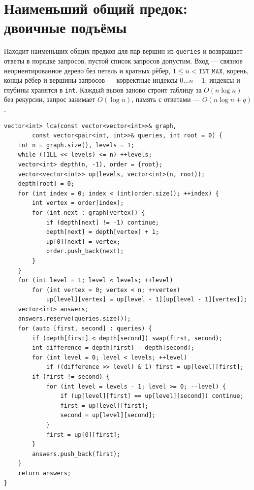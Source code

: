 \section{Наименьший общий предок: двоичные подъёмы}
Находит наименьших общих предков для пар вершин из \texttt{queries} и возвращает ответы в порядке запросов; пустой список запросов допустим.
Вход --- связное неориентированное дерево без петель и кратных рёбер, $1\le n<\texttt{INT\_MAX}$, корень, концы рёбер и вершины запросов --- корректные индексы $0\ldots n-1$; индексы и глубины хранятся в \texttt{int}.
Каждый вызов заново строит таблицу за $O(n\log n)$ без рекурсии, запрос занимает $O(\log n)$, память с ответами --- $O(n\log n+q)$.
\begin{lstlisting}[name=graphs_lca]
vector<int> lca(const vector<vector<int>>& graph,
        const vector<pair<int, int>>& queries, int root = 0) {
    int n = graph.size(), levels = 1;
    while ((1LL << levels) <= n) ++levels;
    vector<int> depth(n, -1), order = {root};
    vector<vector<int>> up(levels, vector<int>(n, root));
    depth[root] = 0;
    for (int index = 0; index < (int)order.size(); ++index) {
        int vertex = order[index];
        for (int next : graph[vertex]) {
            if (depth[next] != -1) continue;
            depth[next] = depth[vertex] + 1;
            up[0][next] = vertex;
            order.push_back(next);
        }
    }
    for (int level = 1; level < levels; ++level)
        for (int vertex = 0; vertex < n; ++vertex)
            up[level][vertex] = up[level - 1][up[level - 1][vertex]];
    vector<int> answers;
    answers.reserve(queries.size());
    for (auto [first, second] : queries) {
        if (depth[first] < depth[second]) swap(first, second);
        int difference = depth[first] - depth[second];
        for (int level = 0; level < levels; ++level)
            if ((difference >> level) & 1) first = up[level][first];
        if (first != second) {
            for (int level = levels - 1; level >= 0; --level) {
                if (up[level][first] == up[level][second]) continue;
                first = up[level][first];
                second = up[level][second];
            }
            first = up[0][first];
        }
        answers.push_back(first);
    }
    return answers;
}
\end{lstlisting}
